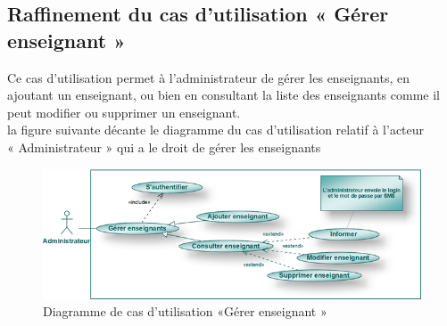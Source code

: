 \documentclass[12 pt ]{report}
\begin{document}
\subsection{Raffinement du cas d’utilisation « Gérer enseignant »}
Ce cas d'utilisation permet à l'administrateur de gérer les enseignants, en ajoutant un enseignant, ou bien en consultant la liste des enseignants comme il peut modifier ou supprimer un enseignant.\\
la figure suivante décante le diagramme du cas d’utilisation  relatif à l’acteur \\« Administrateur » qui a le droit de gérer les enseignants 

 \begin{figure}[h]
 \begin{center}
 \includegraphics[width= 13 cm ,height= 6 cm]{admin2.png}
\caption{ Diagramme de cas d'utilisation  «Gérer enseignant »}
 \end{center}
\end{figure}
\end{document}
